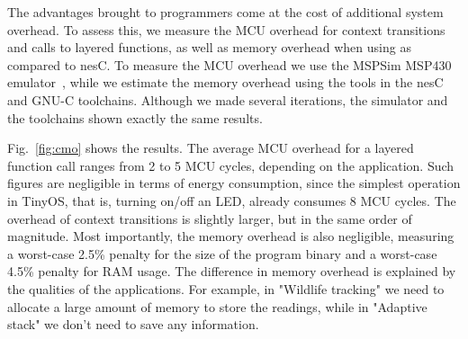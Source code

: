 The advantages brought to programmers come at the cost of additional
system overhead. To assess this, we measure the MCU overhead for
context transitions and calls to layered functions, as well as memory
overhead when using \conesc as compared to nesC. To measure the MCU
overhead we use the MSPSim MSP430 emulator~\cite{eriksson09}, while we
estimate the memory overhead using the tools in the nesC and GNU-C
toolchains. Although we made several iterations, the simulator and the toolchains shown exactly the same results.


 Fig.~\ref{fig:cmo} shows the results. The average MCU overhead
for a layered function call ranges from 2 to 5 MCU cycles, depending on the
application. Such figures are negligible in terms of energy consumption, since
the simplest operation in TinyOS, that is, turning on/off an LED, already
consumes 8 MCU cycles. The overhead of context transitions is slightly larger,
but in the same order of magnitude. Most importantly, the memory overhead is
also negligible, measuring a worst-case 2.5\% penalty for the size of the
program binary and a worst-case 4.5\% penalty for RAM usage. The difference in
memory overhead is explained by the qualities of the applications. For example,
in "Wildlife tracking" we need to allocate a large amount of memory to store the
readings, while in "Adaptive stack" we don't need to save any information.

